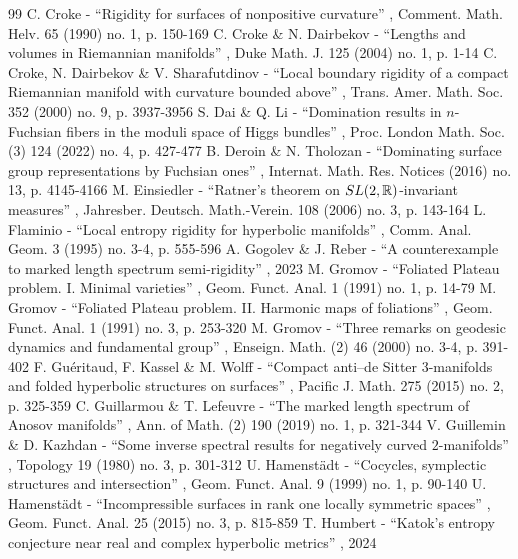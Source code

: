 \documentclass[11pt]{article}
\theoremstyle{plain}
\theoremstyle{definition}
\begin{document}
\begin{thebibliography}{99}
 C. Croke - “Rigidity for surfaces of nonpositive curvature” , Comment. Math. Helv. 65 (1990) no. 1, p. 150-169
 C. Croke \& N. Dairbekov - “Lengths and volumes in Riemannian manifolds” , Duke Math. J. 125 (2004) no. 1, p. 1-14
 C. Croke, N. Dairbekov \& V. Sharafutdinov - “Local boundary rigidity of a compact Riemannian manifold with curvature bounded above” , Trans. Amer. Math. Soc. 352 (2000) no. 9, p. 3937-3956
 S. Dai \& Q. Li - “Domination results in $n$-Fuchsian fibers in the moduli space of Higgs bundles” , Proc. London Math. Soc. (3) 124 (2022) no. 4, p. 427-477
 B. Deroin \& N. Tholozan - “Dominating surface group representations by Fuchsian ones” , Internat. Math. Res. Notices (2016) no. 13, p. 4145-4166
 M. Einsiedler - “Ratner’s theorem on ${\rm SL}(2,\mathbb{R})$-invariant measures” , Jahresber. Deutsch. Math.-Verein. 108 (2006) no. 3, p. 143-164
 L. Flaminio - “Local entropy rigidity for hyperbolic manifolds” , Comm. Anal. Geom. 3 (1995) no. 3-4, p. 555-596
 A. Gogolev \& J. Reber - “A counterexample to marked length spectrum semi-rigidity” , 2023
 M. Gromov - “Foliated Plateau problem. I. Minimal varieties” , Geom. Funct. Anal. 1 (1991) no. 1, p. 14-79
 M. Gromov - “Foliated Plateau problem. II. Harmonic maps of foliations” , Geom. Funct. Anal. 1 (1991) no. 3, p. 253-320
 M. Gromov - “Three remarks on geodesic dynamics and fundamental group” , Enseign. Math. (2) 46 (2000) no. 3-4, p. 391-402
 F. Guéritaud, F. Kassel \& M. Wolff - “Compact anti–de Sitter 3-manifolds and folded hyperbolic structures on surfaces” , Pacific J. Math. 275 (2015) no. 2, p. 325-359
 C. Guillarmou \& T. Lefeuvre - “The marked length spectrum of Anosov manifolds” , Ann. of Math. (2) 190 (2019) no. 1, p. 321-344
 V. Guillemin \& D. Kazhdan - “Some inverse spectral results for negatively curved $2$-manifolds” , Topology 19 (1980) no. 3, p. 301-312
 U. Hamenstädt - “Cocycles, symplectic structures and intersection” , Geom. Funct. Anal. 9 (1999) no. 1, p. 90-140
 U. Hamenstädt - “Incompressible surfaces in rank one locally symmetric spaces” , Geom. Funct. Anal. 25 (2015) no. 3, p. 815-859
 T. Humbert - “Katok’s entropy conjecture near real and complex hyperbolic metrics” , 2024

\end{thebibliography}
\end{document}
